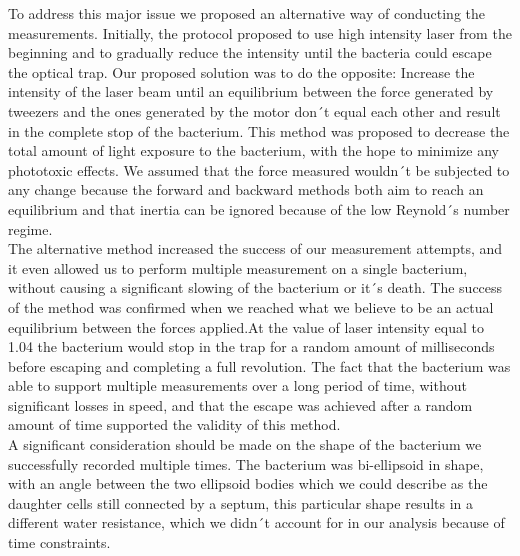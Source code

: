 \documentclass[a4paper,english,12pt,bibliography=totoc]{scrreprt}
\begin{document}
To address this major issue we proposed an alternative way of conducting the measurements. Initially, the protocol proposed to use high intensity laser from the beginning and to gradually reduce the intensity until the bacteria could escape the optical trap.
Our proposed solution was to do the opposite: Increase the intensity of the laser beam until an equilibrium between the force generated by tweezers and the ones generated by the motor don´t equal each other and result in the complete stop of the bacterium. This method was proposed to decrease the total amount of light exposure to the bacterium, with the hope to minimize any phototoxic effects.
We assumed that the force measured wouldn´t be subjected to any change because the forward and backward methods both aim to reach an equilibrium and that inertia can be ignored because of the low Reynold´s number regime.\\
\newline
The alternative method increased the success of our measurement attempts, and it even allowed us to perform multiple measurement on a single bacterium, without causing a significant slowing of the bacterium or it´s death. The success of the method was confirmed when we reached what we believe to be an actual equilibrium between the forces applied.At the value of laser intensity equal to 1.04 the bacterium would stop in the trap for a random amount of milliseconds before escaping and completing a full revolution.
The fact that the bacterium was able to support multiple measurements over a long period of time, without significant losses in speed, and that the escape was achieved after a random amount of  time supported the validity of this method.
\\

A significant consideration should be made on the shape of the bacterium we successfully recorded multiple times. 
The bacterium was bi-ellipsoid in shape, with an angle between the two ellipsoid bodies which we could describe as the daughter cells still connected by a septum, this particular shape results in a different water resistance, which we didn´t account for in our analysis because of time constraints.\\
\end{document}
